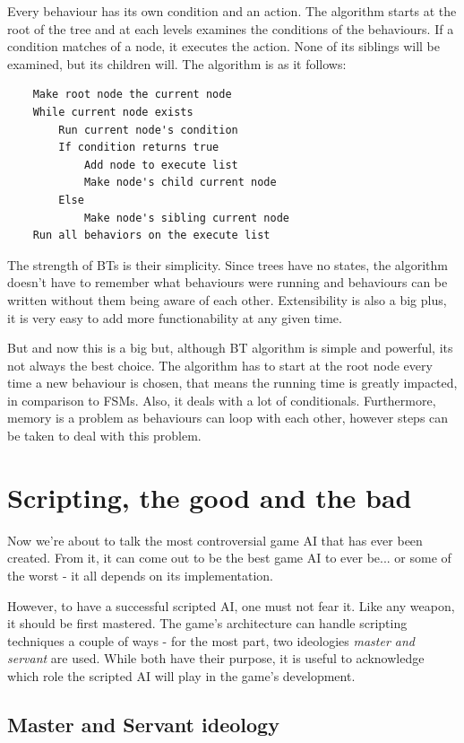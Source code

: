 \documentclass[a4paper, 12pt]{book}
\begin{document}
Every behaviour has its own condition and an action. The algorithm starts at the root of the tree and at each levels examines the conditions of the behaviours. If a condition matches of a node, it executes the action. None of its siblings will be examined, but its children will. The algorithm is as it follows:
\begin{verbatim}
    Make root node the current node
    While current node exists
        Run current node's condition
        If condition returns true
            Add node to execute list
            Make node's child current node
        Else
            Make node's sibling current node
    Run all behaviors on the execute list
\end{verbatim}

The strength of BTs \cite{BehaviourSelectionAlgorithms} is their simplicity. Since trees have no states, the algorithm doesn't have to remember what behaviours were running and behaviours can be written without them being aware of each other. Extensibility is also a big plus, it is very easy to add more functionability at any given time.

But and now this is a big but, although BT algorithm is simple and powerful, its not always the best choice. The algorithm has to start at the root node every time a new behaviour is chosen, that means the running time is greatly impacted, in comparison to FSMs. Also, it deals with a lot of conditionals. Furthermore, memory is a problem as behaviours can loop with each other, however steps can be taken to deal with this problem.

\section{Scripting, the good and the bad}

Now we're about to talk the most controversial game AI that has ever been created. From it, it can come out to be the best game AI to ever be... or some of the worst - it all depends on its implementation.

However, to have a successful scripted AI, one must not fear it. Like any weapon, it should be first mastered. 
The game's architecture can handle scripting techniques a couple of ways - for the most part, two ideologies \emph{master and servant} \cite{ForbiddenScripting} are used. While both have their purpose, it is useful to acknowledge which role the scripted AI will play in the game's development.

\subsection{Master and Servant ideology}
\end{document}

